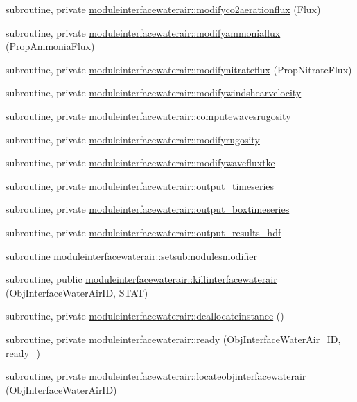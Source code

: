 \begin{DoxyCompactItemize}
subroutine, private \mbox{\hyperlink{namespacemoduleinterfacewaterair_ad16fde1df2013d74710f42901a89754e}{moduleinterfacewaterair\+::modifyco2aerationflux}} (Flux)
\item 
subroutine, private \mbox{\hyperlink{namespacemoduleinterfacewaterair_a8f1f7fa64a06041e2cb84a386c86e9e1}{moduleinterfacewaterair\+::modifyammoniaflux}} (Prop\+Ammonia\+Flux)
\item 
subroutine, private \mbox{\hyperlink{namespacemoduleinterfacewaterair_ac260263b243a28d2d9eb0dce7188d3b0}{moduleinterfacewaterair\+::modifynitrateflux}} (Prop\+Nitrate\+Flux)
\item 
subroutine, private \mbox{\hyperlink{namespacemoduleinterfacewaterair_a067a8627bd218eba128377b9cca8031f}{moduleinterfacewaterair\+::modifywindshearvelocity}}
\item 
subroutine, private \mbox{\hyperlink{namespacemoduleinterfacewaterair_abb9a2be6b590714a3c5b58da190ce52f}{moduleinterfacewaterair\+::computewavesrugosity}}
\item 
subroutine, private \mbox{\hyperlink{namespacemoduleinterfacewaterair_aa7f512949a9b145b55378017e58558a7}{moduleinterfacewaterair\+::modifyrugosity}}
\item 
subroutine, private \mbox{\hyperlink{namespacemoduleinterfacewaterair_a2494cba9b6646ce732323f31ef820a97}{moduleinterfacewaterair\+::modifywavefluxtke}}
\item 
subroutine, private \mbox{\hyperlink{namespacemoduleinterfacewaterair_a739b5f50c0652ff91c9f777fbf68729f}{moduleinterfacewaterair\+::output\+\_\+timeseries}}
\item 
subroutine, private \mbox{\hyperlink{namespacemoduleinterfacewaterair_a8c2f4a754ac1aeb4a3a8045d639e609f}{moduleinterfacewaterair\+::output\+\_\+boxtimeseries}}
\item 
subroutine, private \mbox{\hyperlink{namespacemoduleinterfacewaterair_af0bc1dab0d7eafb5b7f4996d24e4d0bf}{moduleinterfacewaterair\+::output\+\_\+results\+\_\+hdf}}
\item 
subroutine \mbox{\hyperlink{namespacemoduleinterfacewaterair_a5f28ad0176312886bacef9cc171cb2e1}{moduleinterfacewaterair\+::setsubmodulesmodifier}}
\item 
subroutine, public \mbox{\hyperlink{namespacemoduleinterfacewaterair_a9492d98237c53dd77ad30ffe270b64cd}{moduleinterfacewaterair\+::killinterfacewaterair}} (Obj\+Interface\+Water\+Air\+ID, S\+T\+AT)
\item 
subroutine, private \mbox{\hyperlink{namespacemoduleinterfacewaterair_ab0b32961ac4c2950c8d474148dba7b1d}{moduleinterfacewaterair\+::deallocateinstance}} ()
\item 
subroutine, private \mbox{\hyperlink{namespacemoduleinterfacewaterair_a519b1351dce06ffef1eb101335e6361f}{moduleinterfacewaterair\+::ready}} (Obj\+Interface\+Water\+Air\+\_\+\+ID, ready\+\_\+)
\item 
subroutine, private \mbox{\hyperlink{namespacemoduleinterfacewaterair_a17c41a363434acdb52729214d81e9e86}{moduleinterfacewaterair\+::locateobjinterfacewaterair}} (Obj\+Interface\+Water\+Air\+ID)
\end{DoxyCompactItemize}

